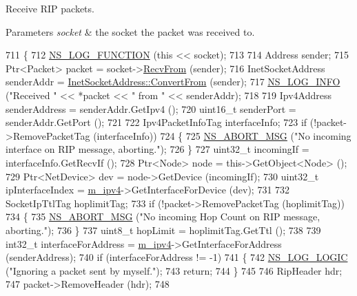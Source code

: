 Receive R\+IP packets. 


\begin{DoxyParams}{Parameters}
{\em socket} & the socket the packet was received to. \\
\hline
\end{DoxyParams}

\begin{DoxyCode}
711 \{
712   \hyperlink{log-macros-disabled_8h_a90b90d5bad1f39cb1b64923ea94c0761}{NS\_LOG\_FUNCTION} (\textcolor{keyword}{this} << socket);
713 
714   Address sender;
715   Ptr<Packet> packet = socket->\hyperlink{classns3_1_1Socket_af22378d7af9a2745a9eada20210da215}{RecvFrom} (sender);
716   InetSocketAddress senderAddr = \hyperlink{classns3_1_1InetSocketAddress_ade776b1109e7b9a7be0b22ced49931e3}{InetSocketAddress::ConvertFrom} (sender);
717   \hyperlink{group__logging_gafbd73ee2cf9f26b319f49086d8e860fb}{NS\_LOG\_INFO} (\textcolor{stringliteral}{"Received "} << *packet << \textcolor{stringliteral}{" from "} << senderAddr);
718 
719   Ipv4Address senderAddress = senderAddr.GetIpv4 ();
720   uint16\_t senderPort = senderAddr.GetPort ();
721 
722   Ipv4PacketInfoTag interfaceInfo;
723   \textcolor{keywordflow}{if} (!packet->RemovePacketTag (interfaceInfo))
724     \{
725       \hyperlink{group__fatal_ga51ac4699be799d772ae7258d1ef6af21}{NS\_ABORT\_MSG} (\textcolor{stringliteral}{"No incoming interface on RIP message, aborting."});
726     \}
727   uint32\_t incomingIf = interfaceInfo.GetRecvIf ();
728   Ptr<Node> node = this->GetObject<Node> ();
729   Ptr<NetDevice> dev = node->GetDevice (incomingIf);
730   uint32\_t ipInterfaceIndex = \hyperlink{classns3_1_1Rip_a6e2c0e74d2fa8643d223db26621dd7f1}{m\_ipv4}->GetInterfaceForDevice (dev);
731 
732   SocketIpTtlTag hoplimitTag;
733   \textcolor{keywordflow}{if} (!packet->RemovePacketTag (hoplimitTag))
734     \{
735       \hyperlink{group__fatal_ga51ac4699be799d772ae7258d1ef6af21}{NS\_ABORT\_MSG} (\textcolor{stringliteral}{"No incoming Hop Count on RIP message, aborting."});
736     \}
737   uint8\_t hopLimit = hoplimitTag.GetTtl ();
738 
739   int32\_t interfaceForAddress = \hyperlink{classns3_1_1Rip_a6e2c0e74d2fa8643d223db26621dd7f1}{m\_ipv4}->GetInterfaceForAddress (senderAddress);
740   \textcolor{keywordflow}{if} (interfaceForAddress != -1)
741     \{
742       \hyperlink{group__logging_ga88acd260151caf2db9c0fc84997f45ce}{NS\_LOG\_LOGIC} (\textcolor{stringliteral}{"Ignoring a packet sent by myself."});
743       \textcolor{keywordflow}{return};
744     \}
745 
746   RipHeader hdr;
747   packet->RemoveHeader (hdr);
748 

\end{DoxyCode}
